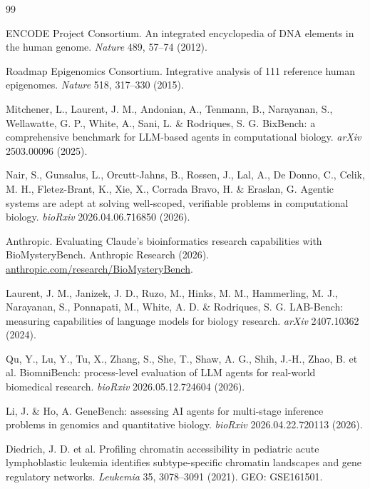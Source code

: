 {\fontsize{8.3}{10.7}\selectfont
\begin{thebibliography}{99}

 ENCODE Project Consortium. An integrated encyclopedia
of DNA elements in the human genome. \textit{Nature} 489, 57--74 (2012).

 Roadmap Epigenomics Consortium. Integrative analysis
of 111 reference human epigenomes. \textit{Nature} 518, 317--330 (2015).

 Mitchener, L., Laurent, J. M., Andonian, A.,
Tenmann, B., Narayanan, S., Wellawatte, G. P., White, A., Sani, L. \&
Rodriques, S. G. BixBench: a comprehensive benchmark for LLM-based agents in
computational biology. \textit{arXiv} 2503.00096 (2025).

 Nair, S., Gunsalus, L., Orcutt-Jahns, B.,
Rossen, J., Lal, A., De Donno, C., Celik, M. H., Fletez-Brant, K., Xie, X.,
Corrada Bravo, H. \& Eraslan, G. Agentic systems are adept at solving
well-scoped, verifiable problems in computational biology. \textit{bioRxiv}
2026.04.06.716850 (2026).

 Anthropic. Evaluating Claude's bioinformatics
research capabilities with BioMysteryBench. Anthropic Research (2026).
\href{https://www.anthropic.com/research/Evaluating-Claude-For-Bioinformatics-With-BioMysteryBench}{anthropic.com/research/BioMysteryBench}.

 Laurent, J. M., Janizek, J. D., Ruzo, M.,
Hinks, M. M., Hammerling, M. J., Narayanan, S., Ponnapati, M., White,
A. D. \& Rodriques, S. G. LAB-Bench: measuring capabilities of language
models for biology research. \textit{arXiv} 2407.10362 (2024).

 Qu, Y., Lu, Y., Tu, X., Zhang, S., She, T.,
Shaw, A. G., Shih, J.-H., Zhao, B. et al. BiomniBench: process-level
evaluation of LLM agents for real-world biomedical research. \textit{bioRxiv}
2026.05.12.724604 (2026).

 Li, J. \& Ho, A. GeneBench: assessing AI agents for
multi-stage inference problems in genomics and quantitative biology.
\textit{bioRxiv} 2026.04.22.720113 (2026).

 Diedrich, J. D. et al. Profiling chromatin
accessibility in pediatric acute lymphoblastic leukemia identifies
subtype-specific chromatin landscapes and gene regulatory networks.
\textit{Leukemia} 35, 3078--3091 (2021). GEO: GSE161501.


\end{thebibliography}}
